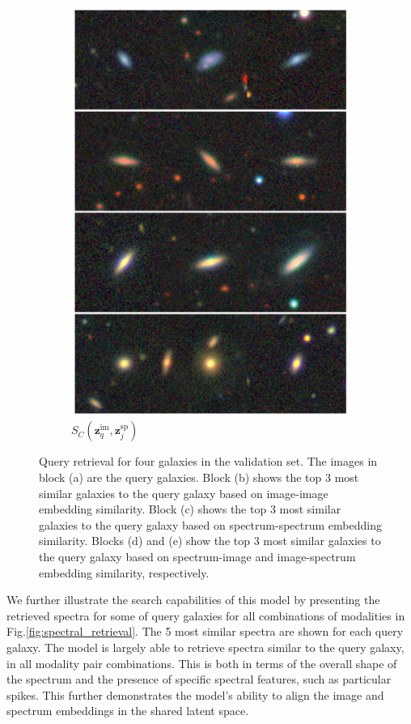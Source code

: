 \documentclass[a4paper,12pt]{article}
\begin{document}
\begin{figure}[H]
\begin{subfigure}{0.22\textwidth}
        \includegraphics[height=0.21\textheight]{../figures/images_sp_im.png}
        \caption{$S_C(\mathbf{z}_q^{\text{im}}, \mathbf{z}_j^{\text{sp}})$}
        \label{fig:retrieval_5}
    \end{subfigure}
    \caption{Query retrieval for four galaxies in the validation set. The images in block (a) are the query galaxies. Block (b) shows the top 3 most similar galaxies to the query galaxy based on image-image embedding similarity. Block (c) shows the top 3 most similar galaxies to the query galaxy based on spectrum-spectrum embedding similarity. Blocks (d) and (e) show the top 3 most similar galaxies to the query galaxy based on spectrum-image and image-spectrum embedding similarity, respectively.}
    \label{fig:retrieval}
\end{figure}
We further illustrate the search capabilities of this model by presenting the retrieved spectra for some of query galaxies for all combinations of modalities in Fig.\ref{fig:spectral_retrieval}. The 5 most similar spectra are shown for each query galaxy. The model is largely able to retrieve spectra similar to the query galaxy, in all modality pair combinations. This is both in terms of the overall shape of the spectrum and the presence of specific spectral features, such as particular spikes. This further demonstrates the model's ability to align the image and spectrum embeddings in the shared latent space.
\end{document}
